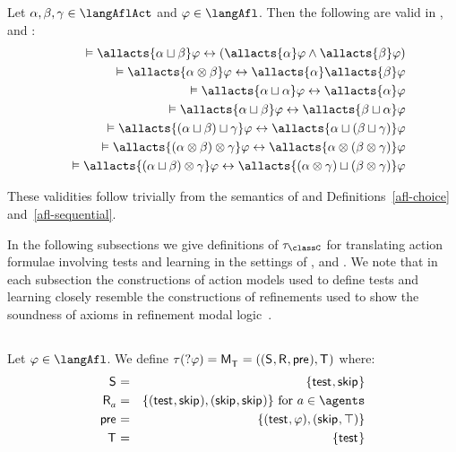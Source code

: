 \begin{proposition}\label{afl-choice-sequential-validities}
Let $\alpha, \beta, \gamma \in \langAflAct$ and $\phi \in \langAfl$. Then the following are valid in \logicAflK{}, \logicAflKFF{} and \logicAflS{}:
\begin{eqnarray*}
    &&\entails \allacts{\alpha \choice \beta} \phi \iff (\allacts{\alpha} \phi \land \allacts{\beta} \phi) \label{afl-axiom-choice}\\
    &&\entails \allacts{\alpha \compose \beta} \phi \iff \allacts{\alpha} \allacts{\beta} \phi \label{afl-axiom-sequential}\\
    &&\entails \allacts{\alpha \choice \alpha} \phi \iff \allacts{\alpha} \phi\\
    &&\entails \allacts{\alpha \choice \beta} \phi \iff \allacts{\beta \choice \alpha} \phi\\
    &&\entails \allacts{(\alpha \choice \beta) \choice \gamma} \phi \iff \allacts{\alpha \choice (\beta \choice \gamma)} \phi\\
    &&\entails \allacts{(\alpha \compose \beta) \compose \gamma} \phi \iff \allacts{\alpha \compose (\beta \compose \gamma)} \phi\\
    &&\entails \allacts{(\alpha \choice \beta) \compose \gamma} \phi \iff \allacts{(\alpha \compose \gamma) \choice (\beta \compose \gamma)} \phi
\end{eqnarray*}
\end{proposition}

These validities follow trivially from the semantics of \logicAaflC{} and Definitions~\ref{afl-choice} and~\ref{afl-sequential}.

In the following subsections we give definitions of $\tau_\classC$ for translating action formulae involving tests and learning in the settings of \classK{}, \classKFF{} and \classS{}.
We note that in each subsection the constructions of action models used to define tests and learning closely resemble the constructions of refinements used to show the soundness of axioms in refinement modal logic~\cite{bozzelli:2014b,hales:2012}.

\subsection{\classK{}}

\begin{definition}[Test]\label{afl-k-test}
Let $\phi \in \langAfl$. 
We define $\tau(\test{\phi}) = \aPModel{\aStatesT} = \aPModelTuple{\aStatesT}$ where:
\begin{eqnarray*}
    \aStates &=& \{\aStateTest, \aStateSkip\}\\
    \aAccessibility{\agentA} &=& \{(\aStateTest, \aStateSkip), (\aStateSkip, \aStateSkip)\} \text{ for } \agentA \in \agents\\
    \aPrecondition &=& \{(\aStateTest, \phi), (\aStateSkip, \top)\}\\
    \aStatesT &=& \{\aStateTest\}
\end{eqnarray*}
\end{definition}

